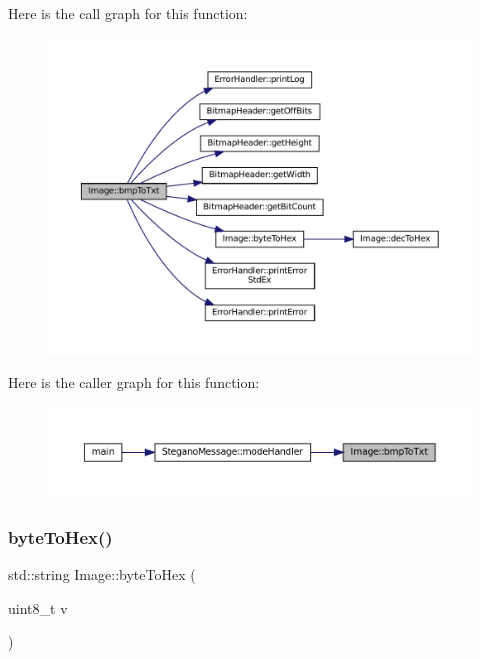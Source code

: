 Here is the call graph for this function\+:
\nopagebreak
\begin{figure}[H]
\begin{center}
\leavevmode
\includegraphics[width=350pt]{classImage_aa16c9acd068079c676dec4186262b1b7_cgraph}
\end{center}
\end{figure}
Here is the caller graph for this function\+:
\nopagebreak
\begin{figure}[H]
\begin{center}
\leavevmode
\includegraphics[width=350pt]{classImage_aa16c9acd068079c676dec4186262b1b7_icgraph}
\end{center}
\end{figure}
\mbox{\label{classImage_ac1c14eba8a20f8bb71c3c21eaba90ecb}} 
\subsubsection{\texorpdfstring{byteToHex()}{byteToHex()}}
{\footnotesize\ttfamily std\+::string Image\+::byte\+To\+Hex (\begin{DoxyParamCaption}\item[{uint8\+\_\+t}]{v }\end{DoxyParamCaption})\hspace{0.3cm}{\ttfamily [static]}}




